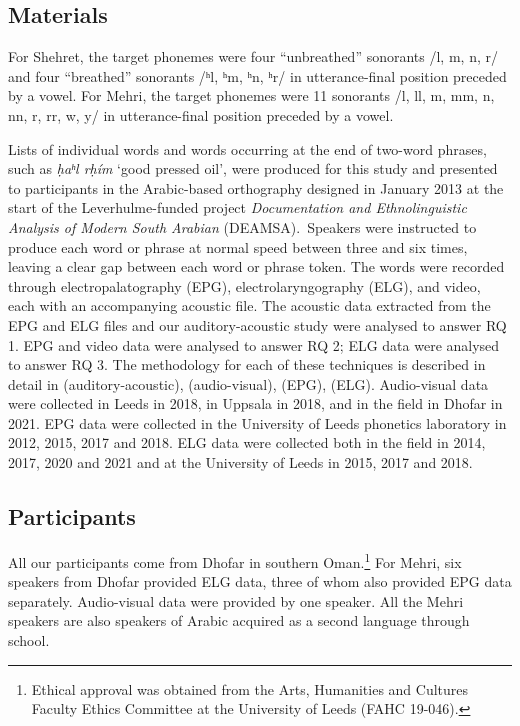 \documentclass[output=paper]{langscibook}
\begin{document}
\subsection{Materials}
\label{sec:watson:3.3}
For Shehret, the target phonemes were four ``unbreathed'' sonorants /l, m, n, r/ and four ``breathed'' sonorants /ʰl, ʰm, ʰn, ʰr/ in utterance-final position preceded by a vowel. For Mehri, the target phonemes were 11 sonorants /l, ll, m, mm, n, nn, r, rr, w, y/ in utterance-final position preceded by a vowel.

{Lists of individual words and words occurring at the end of two-word phrases, such as \textit{ḥaʰl rḥím} ‘good pressed oil’, were produced for this study and presented to participants in the Arabic-based orthography designed in January 2013 at the start of the Leverhulme-funded project \textit{Documentation and Ethnolinguistic Analysis of Modern South Arabian} (DEAMSA).~Speakers were instructed to produce each word or phrase at normal speed between three and six times, leaving a clear gap between each word or phrase token. The words were recorded through electropalatography (EPG), electrolaryngography (ELG), and video, each with an accompanying acoustic file. The acoustic data extracted from the EPG and ELG files and our auditory-acoustic study were analysed to answer RQ 1. EPG and video data were analysed to answer RQ 2; ELG data were analysed to answer RQ 3.} {The methodology for each of these techniques is described in detail in  (auditory-acoustic),  (audio-visual),  (EPG),  (ELG).} Audio-visual data were collected in Leeds in 2018, in Uppsala in 2018, and in the field in Dhofar in 2021. EPG data were collected in the University of Leeds phonetics laboratory in 2012, 2015, 2017 and 2018. ELG data were collected both in the field in 2014, 2017, 2020 and 2021 and at the University of Leeds in 2015, 2017 and 2018.

\subsection{Participants} %
\label{sec:watson:3.4}
All our participants come from Dhofar in southern Oman.\footnote{Ethical approval was obtained from the Arts, Humanities and Cultures Faculty Ethics Committee at the University of Leeds (FAHC 19-046).} For Mehri, six speakers from Dhofar provided ELG data, three of whom also provided EPG data separately. Audio-visual data were provided by one speaker. All the Mehri speakers are also speakers of Arabic acquired as a second language through school.
\end{document}
